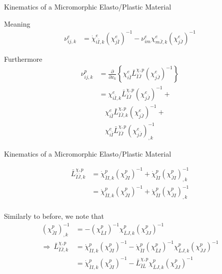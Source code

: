 \documentclass[11pt]{beamer}
\begin{document}
\begin{frame}{Kinematics of a Micromorphic Elasto/Plastic Material}

Meaning
\begin{align*}
\nu_{ij,k}^e &= \dot{\chi}_{i\bar{I},k}^e \left(\chi_{j\bar{I}}^e\right)^{-1} - \nu_{im}^e \chi_{m\bar{J},k}^e\left(\chi_{j\bar{J}}^e\right)^{-1}
\end{align*}

Furthermore
\begin{align*}
\nu_{ij,k}^p &= \frac{\partial}{\partial x_k}\left\{\chi_{i\bar{I}}^e \bar{L}_{\bar{I}\bar{J}}^{\chi,p} \left(\chi_{j\bar{J}}^e\right)^{-1}\right\}\\
&= \chi_{i\bar{I},k}^e \bar{L}_{\bar{I}\bar{J}}^{\chi,p} \left(\chi_{j\bar{J}}^e\right)^{-1}+\\
&\ \ \ \ \chi_{i\bar{I}}^e \bar{L}_{\bar{I}\bar{J},k}^{\chi,p}\left(\chi_{j \bar{J}}^e\right)^{-1} +\\
&\ \ \ \ \chi_{i\bar{I}}^e \bar{L}_{\bar{I}\bar{J}}^{\chi,p} \left(\chi_{j\bar{J}}^e\right)_{,k}^{-1}
\end{align*}

\end{frame}

\begin{frame}{Kinematics of a Micromorphic Elasto/Plastic Material}

\begin{align*}
\bar{L}_{\bar{I}\bar{J},k}^{\chi,p} &= \dot{\chi}_{\bar{I}I,k}^p \left(\chi_{\bar{J} I}^p\right)^{-1} + \dot{\chi}_{\bar{I}I}^p \left(\chi_{\bar{J}I}^p\right)_{,k}^{-1}\\
&= \dot{\chi}_{\bar{I}I,k}^p \left(\chi_{\bar{J} I}^p\right)^{-1} + \dot{\chi}_{\bar{I}I}^p \left(\chi_{\bar{J}I}^p\right)_{,k}^{-1}\\
\end{align*}

Similarly to before, we note that
\begin{align*}
\left(\chi_{\bar{J}I}^p\right)_{,k}^{-1} &= -\left(\chi_{\bar{L}I}^p\right)^{-1}\chi_{\bar{L}J,k}^p \left(\chi_{\bar{J}J}^p\right)^{-1}\\
\Rightarrow\ \bar{L}_{\bar{I}\bar{J},k}^{\chi,p} &= \dot{\chi}_{\bar{I}I,k}^p \left(\chi_{\bar{J} I}^p\right)^{-1} - \dot{\chi}_{\bar{I}I}^p \left(\chi_{\bar{L}I}^p\right)^{-1}\chi_{\bar{L}J,k}^p \left(\chi_{\bar{J}J}^p\right)^{-1}\\
&= \dot{\chi}_{\bar{I}I,k}^p \left(\chi_{\bar{J} I}^p\right)^{-1} - \bar{L}_{\bar{I}\bar{L}}^{\chi,p}\chi_{\bar{L}J,k}^p \left(\chi_{\bar{J}J}^p\right)^{-1}\\
\end{align*}

\end{frame}
\end{document}
